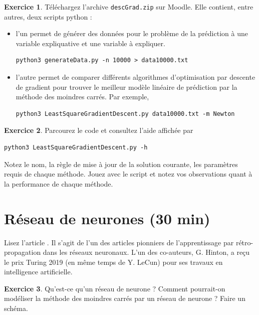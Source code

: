 \documentclass[a4paper,francais]{article}
\theoremstyle{definition}
\newtheorem{exercice}{Exercice}[section]
\begin{document}
\begin{exercice}
Téléchargez l'archive \texttt{descGrad.zip} sur Moodle. Elle contient, entre autres, deux scripts python :
\begin{itemize}
\item
  l'un permet de générer des données pour le problème de la prédiction à une variable expliquative
  et une variable à expliquer.
\begin{verbatim}
python3 generateData.py -n 10000 > data10000.txt
\end{verbatim}
\item l'autre permet de comparer différents algorithmes d'optimisation par descente de gradient
  pour trouver le meilleur modèle linéaire de prédiction par la méthode des moindres carrés.
  Par exemple,  
\begin{verbatim}
python3 LeastSquareGradientDescent.py data10000.txt -m Newton 
\end{verbatim}
\end{itemize}
\end{exercice}

\begin{exercice}
Parcourez le code et consultez l'aide affichée par
\begin{verbatim}
python3 LeastSquareGradientDescent.py -h 
\end{verbatim}
Notez le nom, la règle de mise à jour de la solution courante,
les paramètres requis de chaque méthode. Jouez avec le script et
notez vos observations quant à la performance de chaque méthode.  
\end{exercice}

\section{Réseau de neurones (30 min)}

Lisez l'article \cite{hinton86}. Il s'agit de l'un des articles pionniers
de l'apprentissage par rétro-propagation dans les réseaux neuronaux. L'un des
co-auteurs, G. Hinton, a reçu le prix Turing 2019 (en même temps de Y. LeCun)
pour ses travaux en intelligence artificielle.  

\begin{exercice}
Qu'est-ce qu'un réseau de neurone ? Comment pourrait-on modéliser
la méthode des moindres carrés par un réseau de neurone ? Faire un schéma. 
\end{exercice}
\end{document}
